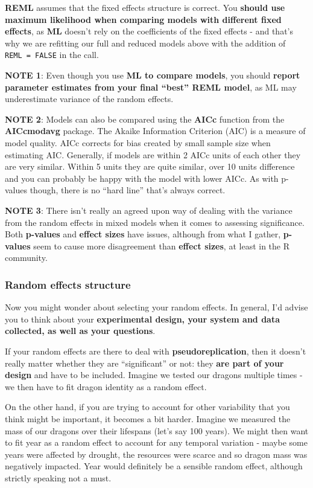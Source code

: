 \documentclass[
]{article}
\begin{document}
\textbf{REML} assumes that the fixed effects structure is correct. You
\textbf{should use maximum likelihood when comparing models with
different fixed effects}, as \textbf{ML} doesn't rely on the
coefficients of the fixed effects - and that's why we are refitting our
full and reduced models above with the addition of
\texttt{REML\ =\ FALSE} in the call.

\textbf{NOTE 1}: Even though you use \textbf{ML to compare models}, you
should \textbf{report parameter estimates from your final ``best'' REML
model}, as ML may underestimate variance of the random effects.

\textbf{NOTE 2}: Models can also be compared using the \textbf{AICc}
function from the \textbf{AICcmodavg} package. The Akaike Information
Criterion (AIC) is a measure of model quality. AICc corrects for bias
created by small sample size when estimating AIC. Generally, if models
are within 2 AICc units of each other they are very similar. Within 5
units they are quite similar, over 10 units difference and you can
probably be happy with the model with lower AICc. As with p-values
though, there is no ``hard line'' that's always correct.

\textbf{NOTE 3}: There isn't really an agreed upon way of dealing with
the variance from the random effects in mixed models when it comes to
assessing significance. Both \textbf{p-values} and \textbf{effect sizes}
have issues, although from what I gather, \textbf{p-values} seem to
cause more disagreement than \textbf{effect sizes}, at least in the R
community.

\subsubsection{Random effects structure}\label{random-effects-structure}

Now you might wonder about selecting your random effects. In general,
I'd advise you to think about your \textbf{experimental design, your
system and data collected, as well as your questions}.

If your random effects are there to deal with
\textbf{pseudoreplication}, then it doesn't really matter whether they
are ``significant'' or not: they \textbf{are part of your design} and
have to be included. Imagine we tested our dragons multiple times - we
then have to fit dragon identity as a random effect.

On the other hand, if you are trying to account for other variability
that you think might be important, it becomes a bit harder. Imagine we
measured the mass of our dragons over their lifespans (let's say 100
years). We might then want to fit year as a random effect to account for
any temporal variation - maybe some years were affected by drought, the
resources were scarce and so dragon mass was negatively impacted. Year
would definitely be a sensible random effect, although strictly speaking
not a must.
\end{document}
